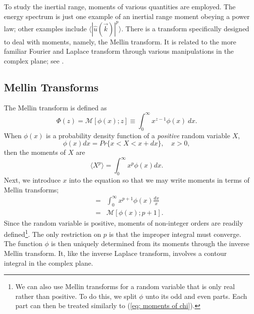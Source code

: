 To study the inertial range, moments of various quantities are employed.  The energy spectrum is just one example of an inertial range moment obeying a power law; other examples include $\langle |\hat{u}(\vec{k})|^p\rangle$.  There is a transform specifically designed to deal with moments, namely, the Mellin transform.  It is related to the more familiar Fourier and Laplace transform through various manipulations in the complex plane; see \cite{Sneddon}.

\subsection{Mellin Transforms}

The Mellin transform is defined as
\begin{equation}
      \Phi(z) = \mathcal{M}[\phi(x);z] \equiv \int_{0}^{\infty}x^{z-1}\phi(x)\ dx. \label{eq:mellin}
\end{equation}
When $\phi(x)$ is a probability density function of a \emph{positive} random variable $X$,
\begin{equation}
    \phi(x)dx = Pr\{x<X<x+dx\}, \quad x>0,
\end{equation}
then the moments of $X$ are
\begin{equation}
    \langle X^{p}\rangle = \int^{\infty}_{0}x^{p}\phi(x)dx.
\end{equation}
Next, we introduce $x$ into the equation so that we may write moments in terms of Mellin transforms;
\begin{eqnarray}
    & = & \int^{\infty}_{0}x^{p+1}\phi(x)\frac{dx}{x} \nonumber \\
    & = & \mathcal{M}[\phi(x);p+1]. \label{eq: moments of chi}
\end{eqnarray}
Since the random variable is positive, moments of non-integer orders are readily defined\footnote{We can also use Mellin transforms for a random variable that is only real rather than positive.   To do this, we split $\phi$ unto its odd and even parts.  Each part can then be treated similarly to (\ref{eq: moments of chi}).}.  The only restriction on $p$ is that the improper integral must converge.  The function $\phi$ is then uniquely determined from its moments through the inverse Mellin transform. It, like the inverse Laplace transform, involves a contour integral in the complex plane.

